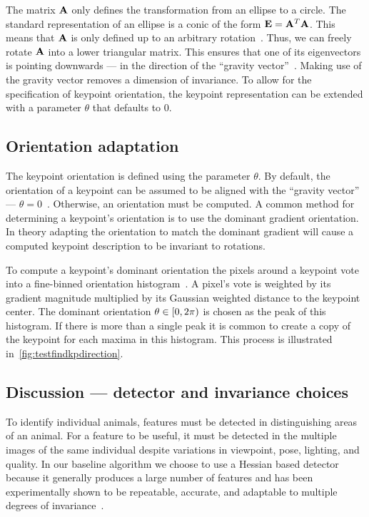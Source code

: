         The matrix $\mathbf{A}$ only defines the transformation from an ellipse to a circle. The standard representation
        of an ellipse is a conic of the form $\mathbf{E} = \mathbf{A}^T\mathbf{A}$. This means that $\mathbf{A}$ is only defined up
        to an arbitrary rotation~\cite{mikolajczyk_comparison_2005,perdoch_efficient_2009}. Thus, we can freely
        rotate $\mathbf{A}$ into a lower triangular matrix. This ensures that one of its eigenvectors is pointing
        downwards --- \ie{} in the direction of the ``gravity vector''~\cite{perdoch_efficient_2009}. Making use of
        the gravity vector removes a dimension of invariance. To allow for the specification of keypoint
        orientation, the keypoint representation can be extended with a parameter $\theta$ that defaults to $0$.

    \subsection{Orientation adaptation}

        The keypoint orientation is defined using the parameter $\theta$.
        By default, the orientation of a keypoint can be assumed to be aligned with the ``gravity vector'' ---
          \ie{} $\theta=0$~\cite{perdoch_efficient_2009}.
        Otherwise, an orientation must be computed.
        A common method for determining a keypoint's orientation is to use the dominant gradient orientation.
        In theory adapting the orientation to match the dominant gradient will cause a computed keypoint
          description to be invariant to rotations.

        To compute a keypoint's dominant orientation the pixels around a keypoint vote into a fine-binned
        orientation histogram~\cite{lowe_distinctive_2004}. A pixel's vote is weighted by its gradient magnitude
        multiplied by its Gaussian weighted distance to the keypoint center. The dominant orientation %
        $\theta \in [0,2\pi\rparen$ is chosen as the peak of this histogram. If there is more than a single peak
        it is common to create a copy of the keypoint for each maxima in this histogram. This process is
        illustrated in~\cref{fig:testfindkpdirection}.

        \testfindkpdirection{}

        \FloatBarrier{}

    \subsection{Discussion --- detector and invariance choices}
        To identify individual animals, features must be detected in distinguishing areas of an animal. For a
        feature to be useful, it must be detected in the multiple images of the same individual despite variations
        in viewpoint, pose, lighting, and quality. In our baseline algorithm we choose to use a Hessian based
        detector~\cite{perdoch_efficient_2009, lindeberg_feature_1998} because it generally produces a large number
        of features and has been experimentally shown to be repeatable, accurate, and adaptable to multiple degrees
        of invariance~\cite{tuytelaars_local_2008}.

